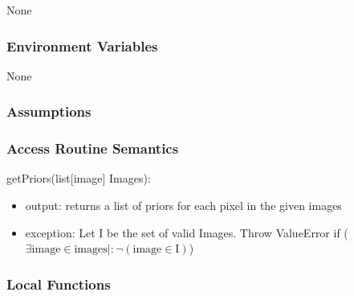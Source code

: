 \documentclass[12pt, titlepage]{article}
\begin{document}
 None
  
  \subsubsection{Environment Variables}
  
  None
  
  \subsubsection{Assumptions}
  
  
  \subsubsection{Access Routine Semantics}
  
  \noindent getPriors(list[image] Images):
  \begin{itemize}
  \item output: returns a list of priors for each pixel in the given images
  \item exception: Let I be the set of valid Images. Throw ValueError if ($\exists \text{image} \in \text{images} |: \neg (\text{image} \in \text{I})$)\\
  \end{itemize}


  
  
  
  \subsubsection{Local Functions}

   
  


\newpage

\end{document}
